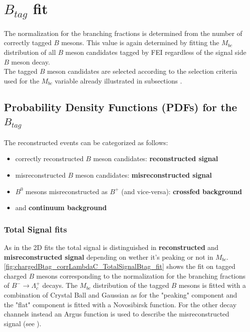 \chapter{$B_{tag}$ fit}

The normalization for the branching fractions is determined from the number of correctly tagged $B$ mesons. 
This value is again determined by fitting the $M_{bc}$ distribution of all $B$ meson candidates tagged
by FEI regardless of the signal side $B$ meson decay.\\
The tagged $B$ meson candidates are selected according to the selection criteria used for the $M_{bc}$ variable  
already illustrated in subsections .


\section{Probability Density Functions (PDFs) for the $B_{tag}$}

The reconstructed events can be categorized as follows:
\begin{itemize}
    \item correctly reconstructed $B$ meson candidates: \textbf{reconstructed signal} 
    \item misreconstructed $B$ meson candidates: \textbf{misreconstructed signal}
    \item $B^0$ mesons misreconstructed as $B^+$ (and vice-versa): \textbf{crossfed background} 
    \item and \textbf{continuum background}
\end{itemize}

\subsection{Total Signal fits}\label{sigBtagFit}

As in the 2D fits the total signal is distinguished in \textbf{reconstructed}  and \textbf{misreconstructed signal} depending
on wether it's peaking or not in  $M_{bc}$.\\
\cref{fig:chargedBtag_corrLambdaC_TotalSignalBtag_fit} shows the fit on tagged charged $B$ mesons corresponding to the normalization for the branching fractions of $B^- \rightarrow \Lambda_c^+$ decays.
The $M_{bc}$ distribution of the tagged  $B$ mesons is fitted with a combination of Crystal Ball and Gaussian as for the "peaking" component and the "flat" component is fitted with a Novosibirsk function. 
For the other decay channels instead an Argus function is used to describe the misreconstructed signal (see ).


